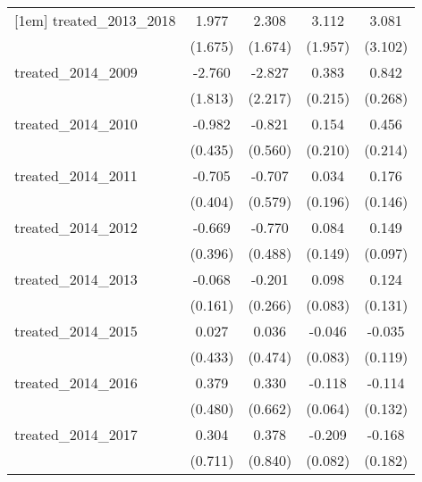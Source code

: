 {\begin{tabular}{l*{4}{c}}
[1em]
treated\_2013\_2018&       1.977         &       2.308         &       3.112         &       3.081         \\
            &     (1.675)         &     (1.674)         &     (1.957)         &     (3.102)         \\
[1em]
treated\_2014\_2009&      -2.760         &      -2.827         &       0.383         &       0.842\sym{**} \\
            &     (1.813)         &     (2.217)         &     (0.215)         &     (0.268)         \\
[1em]
treated\_2014\_2010&      -0.982\sym{*}  &      -0.821         &       0.154         &       0.456\sym{*}  \\
            &     (0.435)         &     (0.560)         &     (0.210)         &     (0.214)         \\
[1em]
treated\_2014\_2011&      -0.705         &      -0.707         &       0.034         &       0.176         \\
            &     (0.404)         &     (0.579)         &     (0.196)         &     (0.146)         \\
[1em]
treated\_2014\_2012&      -0.669         &      -0.770         &       0.084         &       0.149         \\
            &     (0.396)         &     (0.488)         &     (0.149)         &     (0.097)         \\
[1em]
treated\_2014\_2013&      -0.068         &      -0.201         &       0.098         &       0.124         \\
            &     (0.161)         &     (0.266)         &     (0.083)         &     (0.131)         \\
[1em]
treated\_2014\_2015&       0.027         &       0.036         &      -0.046         &      -0.035         \\
            &     (0.433)         &     (0.474)         &     (0.083)         &     (0.119)         \\
[1em]
treated\_2014\_2016&       0.379         &       0.330         &      -0.118         &      -0.114         \\
            &     (0.480)         &     (0.662)         &     (0.064)         &     (0.132)         \\
[1em]
treated\_2014\_2017&       0.304         &       0.378         &      -0.209\sym{*}  &      -0.168         \\
            &     (0.711)         &     (0.840)         &     (0.082)         &     (0.182)         \\

\end{tabular}}

